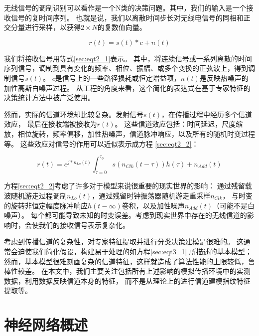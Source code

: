 无线信号的调制识别可以看作是一个N类的决策问题。其中，我们的输入是一个接收信号的复时间序列。
也就是说，我们以离散时间步长对无线电信号的同相和正交分量进行采样，以获得$2 \times N$的复数值向量。\par

\begin{equation}\label{sec:eqt2_1}
r(t) = s(t)*c + n(t)
\end{equation}

我们将接收信号用等式\ref{sec:eqt2_1}表示。
其中，将连续信号或一系列离散的时间序列信号，调制到具有变化的频率、相位、振幅、或多个变换的正弦波上，得到调制信号$s(t)$。
$c$是信号上的一些路径损耗或恒定增益项，$n(t)$是反映热噪声的加性高斯白噪声过程。
从工程的角度来看，这个简化的表达式在基于专家特征的决策统计方法中被广泛使用。\par

然而，实际的信道环境却比较复杂。发射信号$s(t)$，在传播过程中经历多个信道效应， 最后在接收端被接收为$r(t)$。
这些信道效应包括：时间延迟，尺度缩放，相位旋转，频率偏移，加性热噪声，信道脉冲响应，以及所有的随机时变过程等。 
这些效应对信号的作用可以近似表示成方程 \ref{sec:eqt2_2}：\par

\begin{equation}\label{sec:eqt2_2}
r(t) = e^{j*n_{Lo}(t)} \int_{\tau=0}^{\tau_{0}} s(n_{Clk}(t-\tau))h(\tau) + n_{Add}(t)
\end{equation}

方程\ref{sec:eqt2_2}考虑了许多对于模型来说很重要的现实世界的影响：
通过残留载波随机游走过程调制$n_{Lo}(t)$，通过残留时钟振荡器随机游走重采样$n_{Clk}$，
与时变的旋转非恒定幅度脉冲响应$h(t-∞)$卷积，以及加性噪声$n_{Add}(t)$（可能不是白噪声）。
每个都可能导致未知的时变误差。考虑到现实世界中存在的无线信道的影响时，会使我们的接收信号表示复杂化。\par

考虑到传播信道的复杂性，对专家特征提取并进行分类决策建模是很难的。
这通常会迫使我们简化假设，构建易于处理的如方程\ref{sec:eqt3_1} 所描述的基本模型；
然而，基本模型很难刻画复杂的信道特征，这样就造成了算法性能的上限较低，鲁棒性较差。
在本文中，我们主要关注包括所有上述影响的模拟传播环境中的实测数据，利用数据反映信道本身的特征，
而不是从理论上的进行信道建模指纹特征提取等。\par

\section{神经网络概述}


